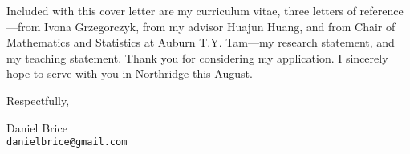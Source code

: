 \documentclass[11pt]{article}
\begin{document}
Included with this cover letter are my curriculum vitae, three letters
of reference---from Ivona Grzegorczyk, from my advisor
Huajun Huang, and from Chair of Mathematics and Statistics at Auburn
T.Y. Tam---my research statement, and my teaching statement. Thank you
for considering my application. I sincerely hope to serve with you in
Northridge this August.

\vfill

Respectfully,

\vfill

Daniel Brice\\
\texttt{danielbrice@gmail.com}

\label{page:last}
\end{document}
